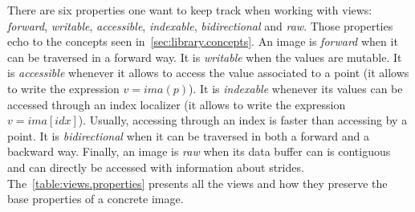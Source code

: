 There are six properties one want to keep track when working with views: \emph{forward}, \emph{writable},
\emph{accessible}, \emph{indexable}, \emph{bidirectional} and \emph{raw}. Those properties echo to the concepts seen
in~\cref{sec:library.concepts}. An image is \emph{forward} when it can be traversed in a forward way. It is
\emph{writable} when the values are mutable. It is \emph{accessible} whenever it allows to access the value associated
to a point (\ie it allows to write the expression \(v = ima(p)\)). It is \emph{indexable} whenever its values can be
accessed through an index localizer (\ie it allows to write the expression \(v = ima[idx]\)). Usually, accessing
through an index is faster than accessing by a point. It is \emph{bidirectional} when it can be traversed in both a
forward and a backward way. Finally, an image is \emph{raw} when its data buffer can is contiguous and can directly be
accessed with information about strides. The~\cref{table:views.properties} presents all the views and how they preserve
the base properties of a concrete image.

